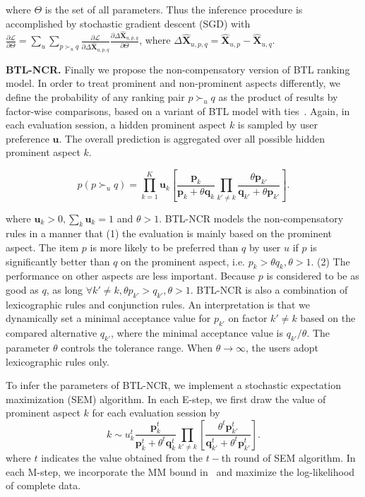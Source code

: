 \documentclass[letterpaper]{article} %
\newcommand{\Rating}{\mathbf{X}}
\newcommand{\Loss}{\mathcal{L}}
\begin{document}
where  $\Theta$ is the set of all parameters. Thus the inference procedure is accomplished by stochastic gradient descent (SGD) with $\frac{\partial \Loss}{\partial \Theta}=  \sum_u \sum_{p\succ_u q} \frac{\partial \Loss}{\partial \Delta\hat{\Rating}_{u,p,q} } \frac{\partial \Delta\hat{\Rating}_{u,p,q}  }{\partial \Theta}$, where $\Delta\hat{\Rating}_{u,p,q} =\hat{\Rating}_{u,p}-\hat{\Rating}_{u,q}$. 



\textbf{BTL-NCR.} Finally we propose the non-compensatory version of BTL ranking model. In order to treat prominent and non-prominent aspects differently, we define the probability of any ranking pair $p\succ_u q$ as the product of results by factor-wise comparisons, based on a variant of BTL model with ties~\cite{Hunter2004MM}. Again, in each evaluation session, a hidden prominent aspect $k$ is sampled by user preference $\mathbf{u}$. The overall prediction is aggregated over all possible hidden prominent aspect $k$. 

\begin{equation}\label{equ:BTL-NCR}
p(p\succ_u q)  =  \prod_{k=1}^{K} \mathbf{u}_k [ {\frac{\mathbf{p}_k}{\mathbf{p}_k+\theta \mathbf{q}_k}}\prod_{k'\neq k}{ \frac{\theta \mathbf{p}_{k'}}{\mathbf{q}_{k'}+\theta \mathbf{p}_{k'}}}].
\end{equation}

where $\mathbf{u}_k >0, \sum_k \mathbf{u}_k=1$ and $\theta>1$.  BTL-NCR models the non-compensatory rules in a manner that (1) the evaluation is mainly based on the prominent aspect. The item $p$ is more likely to be preferred than $q$ by user $u$ if $p$ is significantly better than $q$ on the prominent aspect, i.e. $p_{k} > \theta q_{k}, \theta>1$. (2) The performance on other aspects are less  important. Because $p$ is considered to be as good as $q$, as long $\forall k'\neq k, \theta p_{k'} >  q_{k'}, \theta>1$.  BTL-NCR is also a combination of lexicographic rules and conjunction rules. An interpretation is that we dynamically set a minimal acceptance value for $p_{k'}$ on factor $k'\neq k$ based on the compared alternative $q_{k'}$, where the minimal acceptance value is $q_{k'}/\theta$.  The parameter $\theta$ controls the tolerance range. When $\theta \rightarrow \infty$, the users adopt lexicographic rules only.

To infer the parameters of BTL-NCR, we implement a stochastic expectation maximization (SEM) algorithm. In each E-step, we first draw the value of prominent aspect $k$ for each evaluation session by
 \begin{equation}
 k \sim u_k^{t} \frac{\mathbf{p}_{k}^t} {\mathbf{p}_{k}^t+\theta^t \mathbf{q}_{k}^t} \prod_{k'\neq k}  [\frac{\theta^t \mathbf{p}_{k'}^t} {\mathbf{q}_{k'}^t + \theta^t \mathbf{p}_{k'}^t}].
 \end{equation}
 where $t$ indicates the value obtained from the $t-$th round of SEM algorithm.
 In each M-step, we incorporate the MM bound in~\cite{Hunter2004MM} and maximize the log-likelihood of complete data. 
\end{document}
